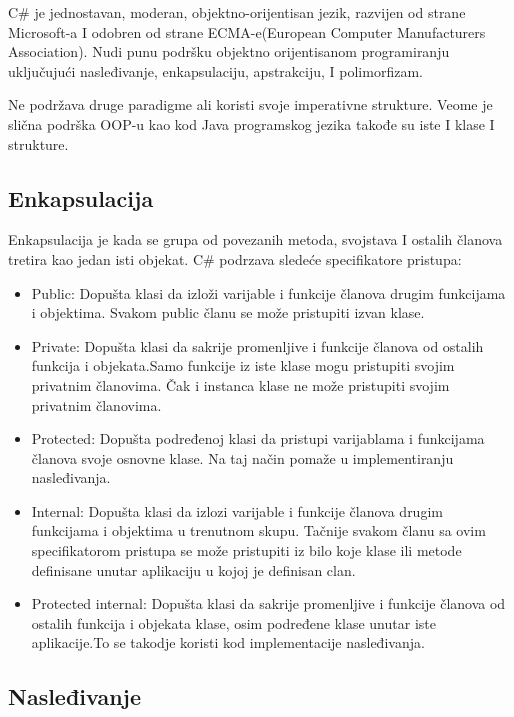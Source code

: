 \documentclass[a4paper]{article}
\begin{document}
{C\# je jednostavan, moderan, objektno-orijentisan jezik, razvijen od strane Microsoft-a I  odobren od strane ECMA-e(European Computer Manufacturers Association).  Nudi punu podršku objektno orijentisanom programiranju uključujući nasleđivanje, enkapsulaciju, apstrakciju, I polimorfizam.

Ne podržava druge paradigme ali koristi svoje imperativne strukture. Veome je slična podrška OOP-u kao kod Java programskog jezika takođe su iste I klase I strukture.

\subsection{Enkapsulacija}
\label{subsec:csharpEnkapsulacija}

Enkapsulacija je kada se grupa od povezanih metoda, svojstava I ostalih članova tretira kao jedan isti objekat.
C\# podrzava sledeće specifikatore pristupa:
\begin{itemize}
\item Public:
Dopušta klasi da izloži varijable i funkcije članova drugim funkcijama i objektima. Svakom public članu se može pristupiti izvan klase.

\item Private:
Dopušta klasi da sakrije promenljive i funkcije članova od ostalih funkcija i objekata.Samo funkcije iz iste klase mogu pristupiti svojim privatnim članovima.  Čak i instanca klase ne može pristupiti svojim privatnim članovima.

\item Protected:
Dopušta podređenoj klasi da pristupi  varijablama i funkcijama članova svoje osnovne klase. Na taj način pomaže u implementiranju nasleđivanja.

\item Internal:
Dopušta klasi da izlozi varijable i funkcije članova drugim funkcijama i objektima u trenutnom skupu. Tačnije svakom članu sa ovim specifikatorom pristupa se može pristupiti iz bilo koje klase ili metode definisane unutar aplikaciju u kojoj je definisan clan.

\item Protected internal:
Dopušta klasi da sakrije promenljive i funkcije članova od ostalih funkcija i objekata klase, osim podređene klase unutar iste aplikacije.To se takodje koristi kod implementacije nasleđivanja.
\end{itemize}

\subsection{Nasleđivanje}
\label{subsec:csharpNasledjivanje}

}
\end{document}
